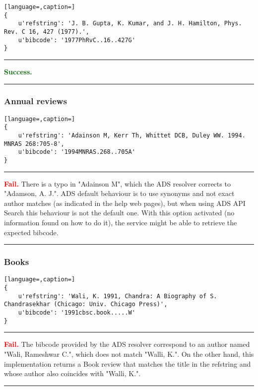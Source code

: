 \documentclass[a4paper,10pt,twoside]{article}
\begin{document}
\begin{lstlisting}[language=,caption=]
{
	u'refstring': 'J. B. Gupta, K. Kumar, and J. H. Hamilton, Phys. Rev. C 16, 427 (1977).',
	u'bibcode': '1977PhRvC..16..427G'
}
\end{lstlisting}

\noindent
{\color{darkgreen} \rule{\linewidth}{0.5mm} }
\textbf{\textcolor{darkgreen}{Success.}} \\
\noindent
{\color{darkgreen} \rule{\linewidth}{0.5mm} }

\newpage
\subsubsection{Annual reviews}

\begin{lstlisting}[language=,caption=]
{
	u'refstring': 'Adainson M, Kerr Th, Whittet DCB, Duley WW. 1994. MNRAS 268:705-8',
	u'bibcode': '1994MNRAS.268..705A'
}
\end{lstlisting}

\noindent
{\color{red} \rule{\linewidth}{0.5mm} }
\textbf{\textcolor{red}{Fail.}} There is a typo in "Adainson M", which the ADS resolver corrects to "Adamson, A. J.".  ADS default behaviour is to use synonyms and not exact author matches (as indicated in the help web pages), but when using ADS API Search this behaviour is not the default one. With this option activated (no information found on how to do it), the service might be able to retrieve the expected bibcode. \\
\noindent
{\color{red} \rule{\linewidth}{0.5mm} }


\subsubsection{Books}

\begin{lstlisting}[language=,caption=]
{
	u'refstring': 'Wali, K. 1991, Chandra: A Biography of S. Chandrasekhar (Chicago: Univ. Chicago Press)',
	u'bibcode': '1991cbsc.book.....W'
}
\end{lstlisting}

\noindent
{\color{red} \rule{\linewidth}{0.5mm} }
\textbf{\textcolor{red}{Fail.}} The bibcode provided by the ADS resolver correspond to an author named "Wali, Rameshwar C.", which does not match "Walli, K.". On the other hand, this implementation returns a Book review that matches the title in the refstring and whose author also coincides with "Walli, K.".\\
\noindent
{\color{red} \rule{\linewidth}{0.5mm} }
\end{document}
